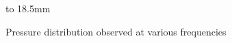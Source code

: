 \begin{figure}[h]
{}
\newline
\hbox to 18.5mm{}%
\caption{ Pressure distribution observed at various frequencies }
\end{figure}




